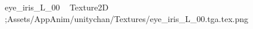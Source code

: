 
   eye_iris_L_00             	   Texture2D
   ;   Assets/AppAnim/unitychan/Textures/eye_iris_L_00.tga.tex.png